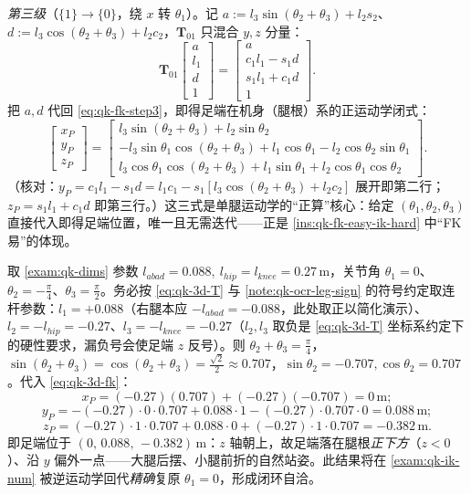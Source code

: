 \emph{第三级}（$\{1\}\!\to\!\{0\}$，绕 $x$ 转 $\theta_1$）。记 $a:=l_3\sin(\theta_2{+}\theta_3)+l_2 s_2$、$d:=l_3\cos(\theta_2{+}\theta_3)+l_2 c_2$，$\mathbf{T}_{01}$ 只混合 $y,z$ 分量：
\begin{equation}
  \mathbf{T}_{01}\begin{bmatrix}a\\ l_1\\ d\\ 1\end{bmatrix}
  =\begin{bmatrix}a\\ c_1 l_1-s_1 d\\ s_1 l_1+c_1 d\\ 1\end{bmatrix}.
  \label{eq:qk-fk-step3}
\end{equation}
把 $a,d$ 代回 \cref{eq:qk-fk-step3}，即得足端在机身（腿根）系的正运动学闭式\cite{unitree2023quadruped}：
\begin{equation}
  \begin{bmatrix}x_P\\y_P\\z_P\end{bmatrix}=
  \begin{bmatrix}
    l_3\sin(\theta_2+\theta_3)+l_2\sin\theta_2\\
    -l_3\sin\theta_1\cos(\theta_2+\theta_3)+l_1\cos\theta_1-l_2\cos\theta_2\sin\theta_1\\
    l_3\cos\theta_1\cos(\theta_2+\theta_3)+l_1\sin\theta_1+l_2\cos\theta_1\cos\theta_2
  \end{bmatrix}.
  \label{eq:qk-3d-fk}
\end{equation}
（核对：$y_P=c_1 l_1-s_1 d=l_1 c_1-s_1[l_3\cos(\theta_2{+}\theta_3)+l_2 c_2]$ 展开即第二行；$z_P=s_1 l_1+c_1 d$ 即第三行。）这三式是单腿运动学的“正算”核心：给定 $(\theta_1,\theta_2,\theta_3)$ 直接代入即得足端位置，唯一且无需迭代——正是 \cref{ins:qk-fk-easy-ik-hard} 中“FK 易”的体现。

\begin{example}[单腿正运动学数值例]\label{exam:qk-fk-num}
取 \cref{exam:qk-dims} 参数 $l_{abad}=0.088,\ l_{hip}=l_{knee}=0.27\,\mathrm{m}$，关节角 $\theta_1=0$、$\theta_2=-\tfrac{\pi}{4}$、$\theta_3=\tfrac{\pi}{2}$。务必按 \cref{eq:qk-3d-T} 与 \cref{note:qk-ocr-leg-sign} 的符号约定取连杆参数：$l_1=+0.088$（右腿本应 $-l_{abad}=-0.088$，此处取正以简化演示）、$l_2=-l_{hip}=-0.27$、$l_3=-l_{knee}=-0.27$（$l_2,l_3$ 取负是 \cref{eq:qk-3d-T} 坐标系约定下的硬性要求，漏负号会使足端 $z$ 反号）。则 $\theta_2+\theta_3=\tfrac{\pi}{4}$，$\sin(\theta_2+\theta_3)=\cos(\theta_2+\theta_3)=\tfrac{\sqrt2}{2}\approx0.707$，$\sin\theta_2=-0.707,\cos\theta_2=0.707$。代入 \cref{eq:qk-3d-fk}：
\[
  x_P=(-0.27)(0.707)+(-0.27)(-0.707)=0\,\mathrm{m};
\]
\[
  y_P=-(-0.27)\cdot0\cdot0.707+0.088\cdot1-(-0.27)\cdot0.707\cdot0=0.088\,\mathrm{m};
\]
\[
  z_P=(-0.27)\cdot1\cdot0.707+0.088\cdot0+(-0.27)\cdot1\cdot0.707=-0.382\,\mathrm{m}.
\]
即足端位于 $(0,\,0.088,\,-0.382)\,\mathrm{m}$：$z$ 轴朝上，故足端落在腿根\emph{正下方}（$z<0$）、沿 $y$ 偏外一点——大腿后摆、小腿前折的自然站姿。此结果将在 \cref{exam:qk-ik-num} 被逆运动学回代\emph{精确}复原 $\theta_1=0$，形成闭环自洽。
\end{example}

